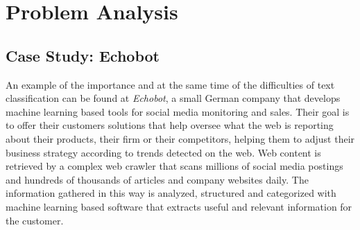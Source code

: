 \chapter{Problem Analysis}
\label{ch:problem-analysis}
% 
% 
% 
% 

\section{Case Study: Echobot}
\label{sec:echobot}
An example of the importance and at the same time of the difficulties of text
classification can be found at \textit{Echobot}, a small
German company that develops machine learning based tools for social media
monitoring and sales. Their goal is to offer their customers solutions that
help oversee what the web is reporting about their products, their firm or
their competitors, helping them to adjust their business strategy according 
to trends detected on the web. Web content is retrieved by a complex web crawler
that scans millions of social media postings and hundreds of thousands
of articles and company websites daily. The information gathered in this way is
analyzed, structured and categorized with machine learning based software that
extracts useful and relevant information for the customer.

